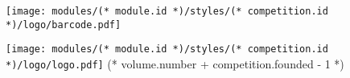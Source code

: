 \documentclass[12pt, oneside]{article}
\begin{document}
            
    \pagestyle{empty}
    \begin{center}
        \null
        \vfill
        \texttt{[image: modules/(* module.id *)/styles/(* competition.id *)/logo/barcode.pdf]}
    \end{center}
    \newpage        
    \begin{center}
        \vspace*{20mm}
        \texttt{[image: modules/(* module.id *)/styles/(* competition.id *)/logo/logo.pdf]}
        \vfill
        \fontsize{60}{25}\selectfont
        (* volume.number + competition.founded - 1 *)
    \end{center}
\end{document}
